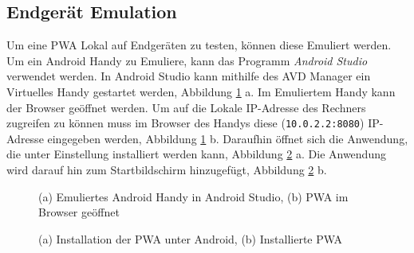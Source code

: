 \subsection{Endgerät Emulation }

Um eine PWA Lokal auf Endgeräten zu testen, können diese Emuliert werden.           
Um ein Android Handy zu Emuliere, kann das Programm \textit{Android Studio} verwendet werden. In Android Studio kann mithilfe des \ac{AVD Manager} ein Virtuelles Handy gestartet werden, Abbildung \ref{Android1} a. Im Emuliertem Handy kann der Browser geöffnet werden. Um auf die Lokale IP-Adresse des Rechners zugreifen zu können muss im Browser des Handys diese (\texttt{10.0.2.2:8080}) IP-Adresse eingegeben werden, Abbildung \ref{Android1} b. Daraufhin öffnet sich die Anwendung, die unter Einstellung installiert werden kann, Abbildung \ref{Android2} a. Die Anwendung wird darauf hin zum Startbildschirm hinzugefügt, Abbildung \ref{Android2} b.  

\begin{figure}[!htb]
    \centering
    \qquad
    \caption{(a) Emuliertes Android Handy in Android Studio, (b) PWA im Browser geöffnet}
    \label{Android1}
\end{figure}

\begin{figure}[!htb]
    \centering
    \qquad
    \caption{(a) Installation der PWA unter Android, (b) Installierte PWA }
    \label{Android2}
\end{figure}